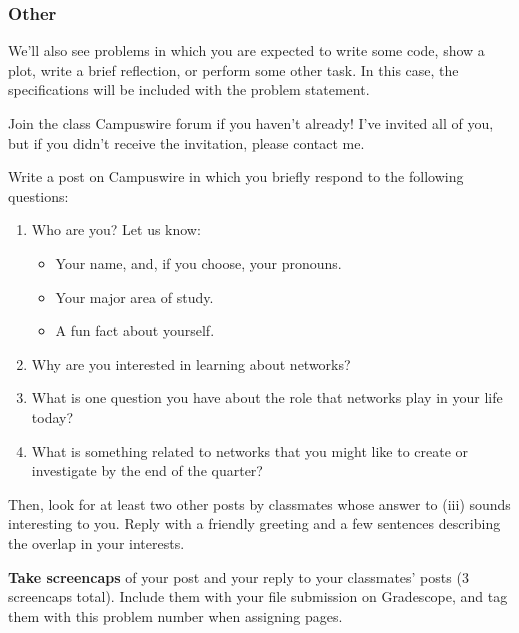 \documentclass{hw}
\begin{document}
\subsubsection*{Other}

We'll also see problems in which you are expected to write some code, show a plot, write a brief reflection, or perform some other task. 
In this case, the specifications will be included with the problem statement. 


\problem{}
    Join the class Campuswire forum if you haven't already! 
    I've invited all of you, but if you didn't receive the invitation, please contact me. 

    Write a post on Campuswire in which you briefly respond to the following questions: 
    \begin{enumerate}
        \item Who are you? Let us know: 
        \begin{itemize}
            \item Your name, and, if you choose, your pronouns. 
            \item Your major area of study. 
            \item A fun fact about yourself. 
        \end{itemize}
        \item Why are you interested in learning about networks? 
        \item What is one question you have about the role that networks play in your life today?
        \item What is something related to networks that you might like to create or investigate by the end of the quarter? 
    \end{enumerate}

    Then, look for at least two other posts by classmates whose answer to (iii) sounds interesting to you. 
    Reply with a friendly greeting and a few sentences describing the overlap in your interests. 

    \textbf{Take screencaps} of your post and your reply to your classmates' posts (3 screencaps total). Include them with your file submission on Gradescope, and tag them with this problem number when assigning pages.  


\problem{}
\end{document}
